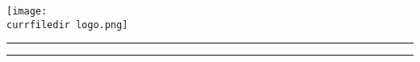 \clearpage

\pagestyle{blank}


\begin{titlepage}
    \centering

    \textbf{\uppercase{\Large\university}}

    \uppercase{\faculty}

    \vspace{64pt}

    \texttt{[image: \\currfiledir logo.png]}

    \vspace{64pt}

    \textbf{\uppercase{\large {}}}

    \parbox[c][\baselineskip]{\textwidth}{\vfill\rule{\textwidth}{0.5pt}\vfill}

    \hspace{0.1\textwidth}
    \textbf{\textit{\uppercase{\Large {}}}}
    \hspace{0.1\textwidth}

    \parbox[c][\baselineskip]{\textwidth}{\vfill\rule{\textwidth}{0.5pt}\vfill}

    \vspace{\baselineskip}

    \begin{minipage}{0.25\linewidth}
    \end{minipage}%
    \begin{minipage}[t]{0.75\linewidth}
        \ifthenelse{\equal{\group}{}}{\dotfill}{\group}
    \end{minipage}

    \vspace{\baselineskip}

    \begin{minipage}{0.25\linewidth}
    \end{minipage}%
    \begin{minipage}[t]{0.75\linewidth}
        \ifthenelse{\equal{\instructors}{}}{\dotfill}{\instructors}
    \end{minipage}

    \vspace{\baselineskip}




\end{titlepage}
